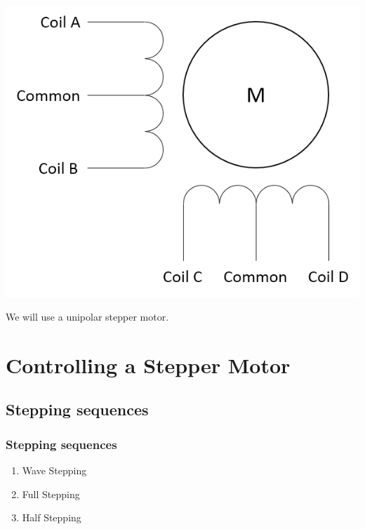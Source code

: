 \documentclass[table,10pt,red]{beamer}	%
\begin{document}
\begin{frame}
\begin{minipage}[c]{0.45\textwidth}
\begin{itemize}
\begin{itemize}
				\end{itemize}
		\end{itemize}
		\includegraphics[width=\linewidth]{Unipolar}
	\end{minipage}
	\pause
	
	We will use a unipolar stepper motor.
\end{frame}
\section{Controlling a Stepper Motor}

\subsection{Stepping sequences}

\begin{frame}
	\frametitle{Stepping sequences}
	\pause
	\begin{enumerate}
		\item <+-|alert@+> Wave Stepping
		\item <+-|alert@+> Full Stepping
		\item <+-|alert@+> Half Stepping
	\end{enumerate}
\end{frame}
\end{document}
